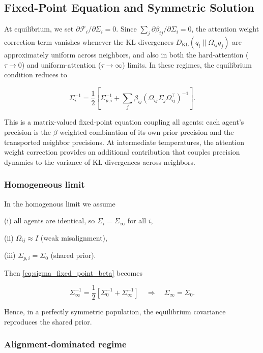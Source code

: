 \documentclass[twoside,11pt]{article}
\begin{document}
\subsection{Fixed-Point Equation and Symmetric Solution}

At equilibrium, we set $\partial \mathcal{F}_i / \partial \Sigma_i = 0$. Since $\sum_j \partial \beta_{ij}/\partial \Sigma_i = 0$, the attention weight correction term vanishes whenever the KL divergences $D_{\mathrm{KL}}(q_i \| \Omega_{ij}q_j)$ are approximately uniform across neighbors, and also in both the hard-attention ($\tau \to 0$) and uniform-attention ($\tau \to \infty$) limits. In these regimes, the equilibrium condition reduces to

\begin{equation}
\Sigma_i^{-1}
=\frac{1}{2}
\left[
\Sigma_{p,i}^{-1}
+ \sum_j \beta_{ij}
(\Omega_{ij}\Sigma_j\Omega_{ij}^\top)^{-1}
\right].
\label{eq:sigma_fixed_point_beta}
\end{equation}

This is a matrix-valued fixed-point equation coupling all agents: each agent's precision is the $\beta$-weighted combination of its own prior precision and the transported neighbor precisions. At intermediate temperatures, the attention weight correction provides an additional contribution that couples precision dynamics to the variance of KL divergences across neighbors.

\subsubsection{Homogeneous limit}

In the homogenous limit we assume

(i) all agents are identical, so $\Sigma_i = \Sigma_\infty$ for all $i$,

(ii) $\Omega_{ij} \approx I$ (weak misalignment),

(iii) $\Sigma_{p,i} = \Sigma_0$ (shared prior).

Then \eqref{eq:sigma_fixed_point_beta} becomes

\begin{equation}
\Sigma_\infty^{-1}
=\frac{1}{2}
\left[
\Sigma_0^{-1}
+ \Sigma_\infty^{-1}
\right]
\quad\Longrightarrow\quad
\Sigma_\infty = \Sigma_0.
\end{equation}

Hence, in a perfectly symmetric population, the equilibrium covariance reproduces the shared prior.

\subsubsection{Alignment-dominated regime}
\end{document}

